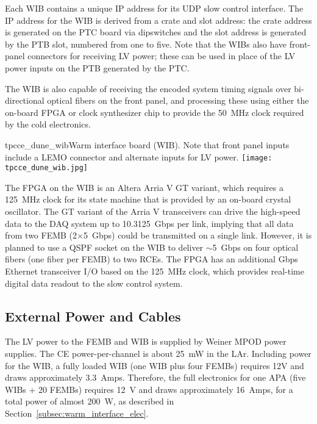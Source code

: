 
Each WIB contains a 
unique IP address for its UDP slow control interface. The IP address for the WIB is 
derived from a crate and slot address: the crate address is generated on the PTC 
board via dipswitches and the slot address is generated by the PTB slot, numbered 
from one to five. Note that the WIBs also have front-panel
connectors for receiving LV power; these can be used in place of 
the LV power inputs on the PTB generated by the PTC.

The WIB is also capable of
receiving the encoded system timing signals over bi-directional optical
fibers on the front panel, and processing these using either
the on-board FPGA or clock synthesizer chip to provide the 50~MHz
clock required by the cold electronics.  

\begin{cdrfigure}{tpcce_dune_wib}{Warm interface board (WIB). Note 
that front panel inputs include a LEMO connector and alternate inputs for LV power.}
\texttt{[image: tpcce\_dune\_wib.jpg]}
\end{cdrfigure}

The FPGA on the WIB is an Altera Arria V GT variant, which requires a
125~MHz clock for its state machine that is provided by an on-board crystal
oscillator. The GT variant of the Arria V
transceivers can drive the high-speed data to the DAQ system up to
10.3125~Gbps per link,  implying that all data from
two FEMB (2$\times$5~Gbps) could be transmitted on a single link. However, it is planned to
use a QSPF socket on the WIB to deliver $\sim$5~Gbps on four optical fibers 
(one fiber per FEMB) to two RCEs.  The FPGA has an additional Gbps Ethernet
transceiver I/O based on the 125~MHz clock, which provides real-time digital data readout to the slow control system.



%
\subsection{External Power and Cables}
\label{subsec:ce_feedthrough_power}

The LV power to the FEMB and WIB is supplied by Weiner MPOD power supplies. 
The CE power-per-channel is about 25~mW in the LAr.
Including power for the WIB, a fully loaded WIB (one WIB plus four FEMBs) requires
12V and draws approximately 3.3~Amps. Therefore, the full electronics for one APA (five WIBs + 20 FEMBs) 
requires 12~V and draws approximately 16~Amps, for a total power of almost 200~W, as 
described in Section~\ref{subsec:warm_interface_elec}.

